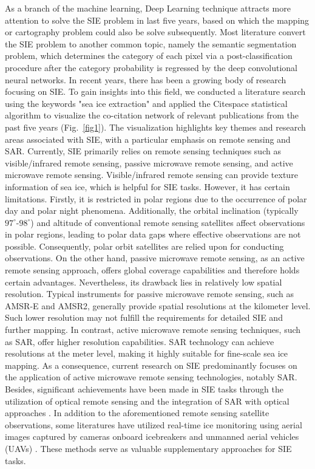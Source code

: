 As a branch of the machine learning, Deep Learning technique attracts more attention to solve the SIE problem in last five years, based on which the mapping or cartography problem could also be solve subsequently. Most literature convert the SIE problem to another common topic, namely the semantic segmentation problem, which determines the category of each pixel via a post-classification procedure after the category probability is regressed by the deep convolutional  neural networks. In recent years, there has been a growing body of research focusing on SIE. To gain insights into this field, we conducted a literature search using the keywords "sea ice extraction" and applied the Citespace\cite{195article} statistical algorithm to visualize the co-citation network of relevant publications from the past five years (Fig.~\ref{fig1}). The visualization highlights key themes and research areas associated with SIE, with a particular emphasis on remote sensing and SAR. Currently, SIE primarily relies on remote sensing techniques such as visible/infrared remote sensing, passive microwave remote sensing, and active microwave remote sensing\cite{155shokr2023sea}. Visible/infrared remote sensing can provide texture information of sea ice, which is helpful for SIE tasks. However, it has certain limitations. Firstly, it is restricted in polar regions due to the occurrence of polar day and polar night phenomena. Additionally, the orbital inclination (typically $97^{\circ}$-$98^{\circ}$) and altitude of conventional remote sensing satellites affect observations in polar regions, leading to polar data gaps where effective observations are not possible. Consequently, polar orbit satellites are relied upon for conducting observations. On the other hand, passive microwave remote sensing, as an active remote sensing approach, offers global coverage capabilities and therefore holds certain advantages. Nevertheless, its drawback lies in relatively low spatial resolution. Typical instruments for passive microwave remote sensing, such as AMSR-E and AMSR2, generally provide spatial resolutions at the kilometer level. Such lower resolution may not fulfill the requirements for detailed SIE and further mapping.  In contrast, active microwave remote sensing techniques, such as SAR, offer higher resolution capabilities. SAR technology can achieve resolutions at the meter level, making it highly suitable for fine-scale sea ice mapping\cite{156murfitt202150}\cite{157lyu2022meta}. As a consequence, current research on SIE predominantly focuses on the application of active microwave remote sensing technologies, notably SAR. Besides, significant achievements have been made in SIE tasks through the utilization of optical remote sensing \cite{15qiu2022automatic}\cite{121kang2022decoding} and the integration of SAR with optical approaches \cite{87li2021fusion}\cite{88han2021sea}\cite{89han2022sea}. In addition to the aforementioned remote sensing satellite observations, some literatures have utilized real-time ice monitoring using aerial images captured by cameras onboard icebreakers \cite{133zhang2021icenetv2}\cite{137panchi2021supplementing} and unmanned aerial vehicles (UAVs) \cite{144wang2019labelled}\cite{132zhang2020icenet}. These methods serve as valuable supplementary approaches for SIE tasks.

